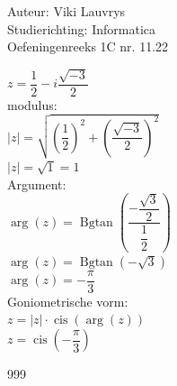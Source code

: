\documentclass[a4paper]{article}
\begin{document}
  
\noindent \large Auteur: Viki Lauvrys        \\
\noindent \large Studierichting: Informatica \\
\noindent \large Oefeningenreeks 1C nr. 11.22 \\

\medskip

\normalsize

$ z = \dfrac{1}{2} - i \dfrac{\sqrt{-3}}{2} $ \\

modulus: \\

$ |z| = \sqrt{\left(\dfrac{1}{2}\right)^2 + \left(\dfrac{\sqrt{-3}}{2}\right)^2} $ \\

$|z| = \sqrt{1} = 1$\\

    
Argument: \\

$ \arg(z) = \operatorname{Bgtan} \left(\dfrac{-\dfrac{\sqrt{3}}{2}}{\dfrac{1}{2}}\right) $\\
	
$ \arg(z) = \operatorname{Bgtan} \left(-\sqrt{3}\right) $\\
	
$ \arg(z) = -\dfrac{\pi}{3} $\\
	
	
Goniometrische vorm: \\

$ z = |z| \cdot \operatorname{cis}(\arg(z))$\\
	
$ z = \operatorname{cis}\left(-\dfrac{\pi}{3}\right)$\\

\begin{thebibliography}{999}
\end{thebibliography}
\end{document}
